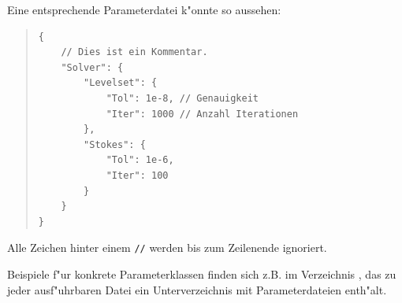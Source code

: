\documentclass[11pt,a4paper]{article}
\newenvironment{Code}{\begin{quote}\scriptsize}{\end{quote}}
\begin{document}
Eine entsprechende Parameterdatei k"onnte so aussehen:
\begin{Code}
\begin{verbatim}
{
    // Dies ist ein Kommentar.
    "Solver": {
        "Levelset": {
            "Tol": 1e-8, // Genauigkeit
            "Iter": 1000 // Anzahl Iterationen
        },
        "Stokes": {
            "Tol": 1e-6,
            "Iter": 100
        }
    }
}
\end{verbatim}
\end{Code}
Alle Zeichen hinter einem \verb|//| werden bis zum Zeilenende ignoriert.

Beispiele f"ur konkrete Parameterklassen finden sich z.B. im Verzeichnis
, das zu jeder ausf"uhrbaren Datei ein Unterverzeichnis mit Parameterdateien enth"alt.



				\appendix


\end{document}
